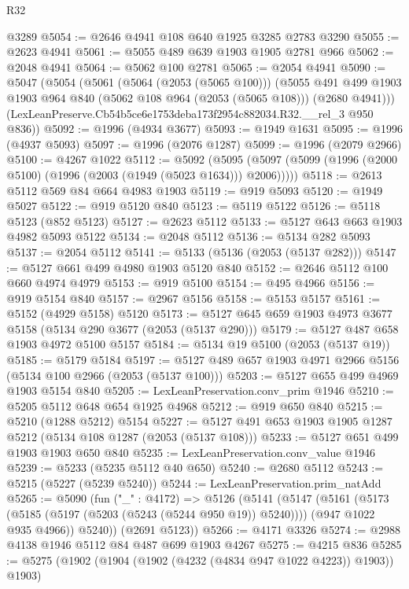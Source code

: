 \begin{lexlean}{R32}
\begin{coremodule}
    @3289
@5054 := @2646 @4941 @108 @640 @1925 @3285 @2783 @3290
@5055 := @2623 @4941
@5061 := @5055 @489 @639 @1903 @1905 @2781 @966
@5062 := @2048 @4941
@5064 := @5062 @100 @2781
@5065 := @2054 @4941
@5090 := @5047
    (@5054
      (@5061
        (@5064 (@2053 (@5065 @100)))
        (@5055
          @491
          @499
          @1903
          @1903
          @964
          @840
          (@5062 @108 @964 (@2053 (@5065 @108)))
          (@2680 @4941)))
      (LexLeanPreserve.Cb54b5ce6e1753deba173f2954c882034.R32.__rel_3 @950 @836))
@5092 := @1996 (@4934 @3677)
@5093 := @1949 @1631
@5095 := @1996 (@4937 @5093)
@5097 := @1996 (@2076 @1287)
@5099 := @1996 (@2079 @2966)
@5100 := @4267 @1022
@5112 := @5092
    (@5095 (@5097 (@5099 (@1996 (@2000 @5100) (@1996 (@2003 (@1949 (@5023 @1634))) @2006)))))
@5118 := @2613 @5112 @569 @84 @664 @4983 @1903
@5119 := @919 @5093
@5120 := @1949 @5027
@5122 := @919 @5120 @840
@5123 := @5119 @5122
@5126 := @5118 @5123 (@852 @5123)
@5127 := @2623 @5112
@5133 := @5127 @643 @663 @1903 @4982 @5093 @5122
@5134 := @2048 @5112
@5136 := @5134 @282 @5093
@5137 := @2054 @5112
@5141 := @5133 (@5136 (@2053 (@5137 @282)))
@5147 := @5127 @661 @499 @4980 @1903 @5120 @840
@5152 := @2646 @5112 @100 @660 @4974 @4979
@5153 := @919 @5100
@5154 := @495 @4966
@5156 := @919 @5154 @840
@5157 := @2967 @5156
@5158 := @5153 @5157
@5161 := @5152 (@4929 @5158) @5120
@5173 := @5127 @645 @659 @1903 @4973 @3677 @5158 (@5134 @290 @3677 (@2053 (@5137 @290)))
@5179 := @5127 @487 @658 @1903 @4972 @5100 @5157
@5184 := @5134 @19 @5100 (@2053 (@5137 @19))
@5185 := @5179 @5184
@5197 := @5127 @489 @657 @1903 @4971 @2966 @5156 (@5134 @100 @2966 (@2053 (@5137 @100)))
@5203 := @5127 @655 @499 @4969 @1903 @5154 @840
@5205 := LexLeanPreservation.conv_prim @1946
@5210 := @5205 @5112 @648 @654 @1925 @4968
@5212 := @919 @650 @840
@5215 := @5210 (@1288 @5212) @5154
@5227 := @5127 @491 @653 @1903 @1905 @1287 @5212 (@5134 @108 @1287 (@2053 (@5137 @108)))
@5233 := @5127 @651 @499 @1903 @1903 @650 @840
@5235 := LexLeanPreservation.conv_value @1946
@5239 := @5233 (@5235 @5112 @40 @650)
@5240 := @2680 @5112
@5243 := @5215 (@5227 (@5239 @5240))
@5244 := LexLeanPreservation.prim_natAdd
@5265 := @5090
    (fun ("_" : @4172) =>
    @5126
      (@5141
        (@5147
          (@5161
            (@5173 (@5185 (@5197 (@5203 (@5243 (@5244 @950 @19)) @5240))))
            (@947 @1022 @935 @4966))
          @5240))
      (@2691 @5123))
@5266 := @4171 @3326
@5274 := @2988 @4138 @1946 @5112 @84 @487 @699 @1903 @4267
@5275 := @4215 @836
@5285 := @5275 (@1902 (@1904 (@1902 (@4232 (@4834 @947 @1022 @4223)) @1903)) @1903)

\end{coremodule}
\end{lexlean}
